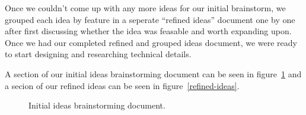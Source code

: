 \documentclass{article}
\begin{document}
Once we couldn't come up with any more ideas for our initial brainstorm, we grouped each idea by feature in a seperate ``refined ideas'' document one by one after first discussing whether the idea was feasable and worth expanding upon. Once we had our completed refined and grouped ideas document, we were ready to start designing and researching technical details.

A section of our initial ideas brainstorming document can be seen in figure~\ref{initial-ideas} and a secion of our refined ideas can be seen in figure~\ref{refined-ideas}.

\begin{figure}[H]
  \centering
  \caption{Initial ideas brainstorming document.}\label{initial-ideas}
\end{figure}
\end{document}
